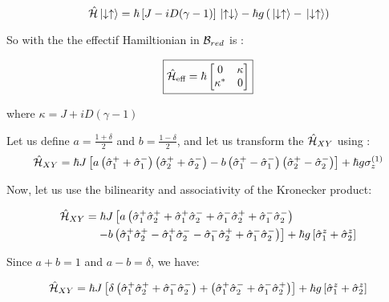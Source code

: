 \begin{equation}
    \hat{\mathcal{H}} \ket*{\downarrow \uparrow} = \hbar \left[J - i D(\gamma - 1)\right] \ket*{\uparrow \downarrow} 
    - \hbar  g\left(\ket*{\downarrow \uparrow} - \ket*{\downarrow \uparrow} \right) 
\end{equation}


So with the the effectif Hamiltionian in $\mathcal{B}_{red}$ is :

\begin{equation}\label{eq: Heff in basis reduce 2 qubits}
    \boxed{\hat{\mathcal{H}}_{\text{eff}} =  \hbar \begin{bmatrix}
        0 & \kappa  \\
        \kappa^* &  0\\
        \end{bmatrix} }
\end{equation}

where $\kappa = J + i D(\gamma - 1)$

Let us define $a = \frac{1+\delta}{2}$ and $b=\frac{1-\delta}{2}$, and 
let us transform the $\hat{\mathcal{H}}_{XY}$ using :
\begin{equation*}
	\hat{\mathcal{H}}_{XY} = \hbar J \left[ a\left( \hat{\sigma}_{1}^+ 
	+ \hat{\sigma}_{1}^-   \right) \left( \hat{\sigma}_{2}^+ 
	+ \hat{\sigma}_{2}^-  \right) - b \left( \hat{\sigma}_{1}^+ 
	- \hat{\sigma}_{1}^-   \right) \left( \hat{\sigma}_{2}^+ 
	- \hat{\sigma}_{2}^-  \right) \right] + 
	\hbar g \sigma_z^{(1)}
\end{equation*}



Now, let us use the bilinearity and associativity of the Kronecker product:

\begin{align*}
    \hat{\mathcal{H}}_{XY} &= \hbar J \left[ a \left( 
        \hat{\sigma}_{1}^+ \hat{\sigma}_{2}^+ 
        + \hat{\sigma}_{1}^+ \hat{\sigma}_{2}^- 
        + \hat{\sigma}_{1}^- \hat{\sigma}_{2}^+
        + \hat{\sigma}_{1}^- \hat{\sigma}_{2}^- \right) \right. \\ 
    &\quad \left. - b \left( 
        \hat{\sigma}_{1}^+ \hat{\sigma}_{2}^+ 
        - \hat{\sigma}_{1}^+ \hat{\sigma}_{2}^- 
        - \hat{\sigma}_{1}^- \hat{\sigma}_{2}^+
        + \hat{\sigma}_{1}^- \hat{\sigma}_{2}^- \right) \right] 
    + \hbar g \left[ \hat{\sigma}_{1}^z + \hat{\sigma}_{2}^z\right]
\end{align*}

Since $a + b = 1$ and $a-b = \delta $, we have:

\begin{align*}
		\hat{\mathcal{H}}_{XY} = \hbar J \left[ \delta \left( 
		\hat{\sigma}_{1}^+ \hat{\sigma}_{2}^+ 
		+ \hat{\sigma}_{1}^- \hat{\sigma}_{2}^- \right) 
		+ \left(
		\hat{\sigma}_{1}^+ \hat{\sigma}_{2}^- 
		+ \hat{\sigma}_{1}^- \hat{\sigma}_{2}^+
		\right)   \right] 
		+ \hbar g \left[ \hat{\sigma}_{1}^z + \hat{\sigma}_{2}^z\right]
\end{align*}

